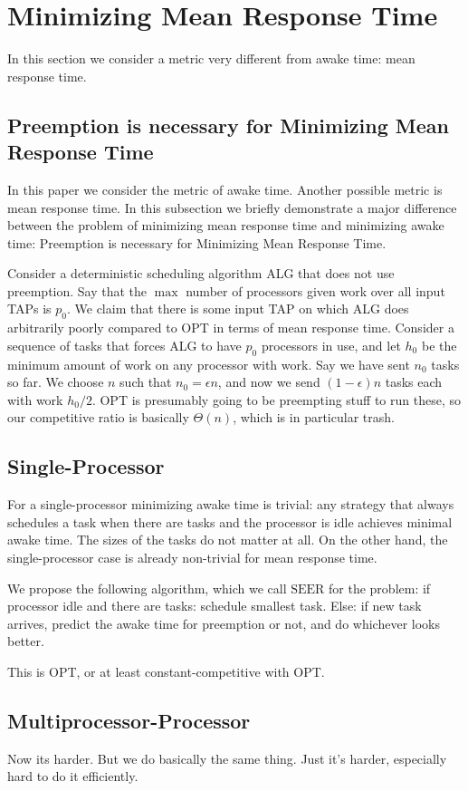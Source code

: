 \section{Minimizing Mean Response Time}
\label{sec:meanresponsetime}

In this section we consider a metric very different from awake
time: mean response time. 

\subsection{Preemption is necessary for Minimizing Mean Response Time}

In this paper we consider the metric of awake time. Another
possible metric is mean response time. In this subsection we
briefly demonstrate a major difference between the problem of
minimizing mean response time and minimizing awake time:
Preemption is necessary for Minimizing Mean Response Time.

Consider a deterministic scheduling algorithm ALG that does not
use preemption. Say that the $\max$ number of processors given
work over all input TAPs is $p_0$. We claim that there is some
input TAP on which ALG does arbitrarily poorly compared to OPT in
terms of mean response time.
Consider a sequence of tasks that forces ALG to have $p_0$
processors in use, and let $h_0$ be the minimum amount of work on
any processor with work. Say we have sent $n_0$ tasks so far.
We choose $n$ such that $n_0 = \epsilon n$, and now we send
$(1-\epsilon)n$ tasks each with work $h_0/2$. OPT is presumably
going to be preempting stuff to run these, so our competitive
ratio is basically $\Theta(n)$, which is in particular trash.


\subsection{Single-Processor}
For a single-processor minimizing awake time is trivial: any
strategy that always schedules a task when there are tasks and
the processor is idle achieves minimal awake time. The sizes of
the tasks do not matter at all.
On the other hand, the single-processor case is already
non-trivial for mean response time.

We propose the following algorithm, which we call
$\text{SEER}$ for
the problem: if processor idle and there are tasks: schedule
smallest task. Else: if new task arrives, predict the
awake time for preemption or not, and do whichever looks better.

\begin{clm}
  This is OPT, or at least constant-competitive with OPT.
\end{clm}

\subsection{Multiprocessor-Processor}
Now its harder. But we do basically the same thing. Just it's
harder, especially hard to do it efficiently.



